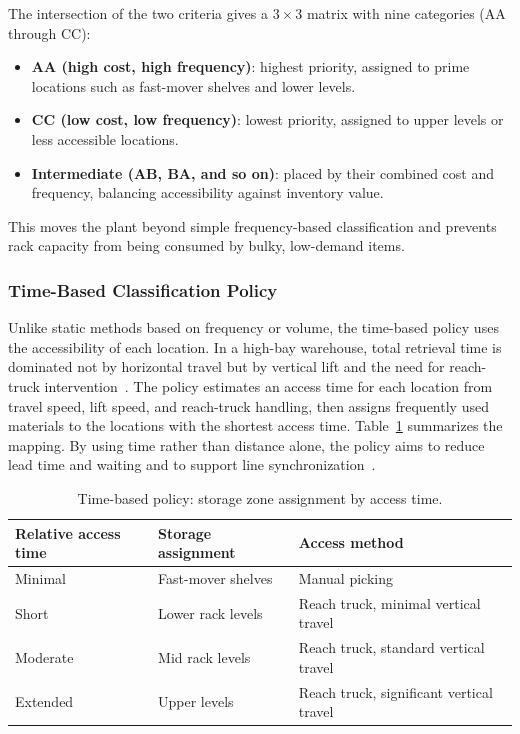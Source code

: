 \documentclass[conference]{IEEEtran}
\begin{document}
The intersection of the two criteria gives a $3 \times 3$ matrix with nine
categories (AA through CC):
\begin{itemize}
\item \textbf{AA (high cost, high frequency)}: highest priority, assigned to
prime locations such as fast-mover shelves and lower levels.
\item \textbf{CC (low cost, low frequency)}: lowest priority, assigned to
upper levels or less accessible locations.
\item \textbf{Intermediate (AB, BA, and so on)}: placed by their combined cost
and frequency, balancing accessibility against inventory value.
\end{itemize}
This moves the plant beyond simple frequency-based classification and prevents
rack capacity from being consumed by bulky, low-demand items.

\subsubsection{Time-Based Classification Policy}
Unlike static methods based on frequency or volume, the time-based policy uses
the accessibility of each location. In a high-bay warehouse, total retrieval
time is dominated not by horizontal travel but by vertical lift and the need
for reach-truck intervention~\cite{bartholdi2014,heskett1963}. The policy
estimates an access time for each location from travel speed, lift speed, and
reach-truck handling, then assigns frequently used materials to the locations
with the shortest access time. Table~\ref{tab:timebased} summarizes the
mapping. By using time rather than distance alone, the policy aims to reduce
lead time and waiting and to support line synchronization~\cite{petersen2004,limere2012}.

\begin{table}[htbp]
\centering
\caption{Time-based policy: storage zone assignment by access time.}
\label{tab:timebased}
\begin{tabular}{lll}
\toprule
Relative access time & Storage assignment & Access method \\
\midrule
Minimal  & Fast-mover shelves & Manual picking \\
Short    & Lower rack levels  & Reach truck, minimal vertical travel \\
Moderate & Mid rack levels    & Reach truck, standard vertical travel \\
Extended & Upper levels       & Reach truck, significant vertical travel \\
\bottomrule
\end{tabular}
\end{table}
\end{document}
